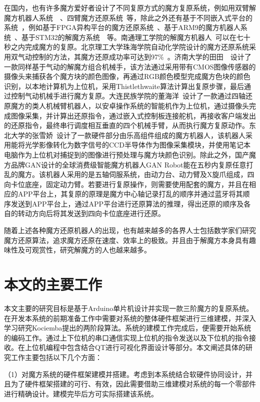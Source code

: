 在国内，也有许多魔方爱好者设计了不同复原方式的魔方复原系统，例如用双臂解魔方机器人系统~\cite{10}~\cite{11}、四臂魔方还原系统~\cite{12}等，除此之外还有基于不同嵌入式平台的系统~\cite{13}，例如基于FPGA异构平台的魔方还原系统~\cite{14}、基于ARM9的魔方机器人系统~\cite{15}、基于STM32的解魔方系统~\cite{11}~\cite{16}等。南通理工学院的解魔方机器人~\cite{17}可以在七十秒之内完成魔方的复原。北京理工大学珠海学院自动化学院设计的魔方还原系统采用双气动控制的方法，其魔方还原成功率可达到97\%~\cite{10}。济南大学的田田~\cite{18}~\cite{19}设计了一款同样基于气动的解魔方组合机械手，该方法通过采用带有CMOS图像传感器的摄像头来捕获各个魔方块的颜色图像，再通过RGB颜色模型完成魔方色块的颜色识别，以本地计算机为上位机，采用Thistlethwaite算法计算出复原步骤，最后通过控制气动机械手进行魔方复原。大连民族学院的董海洋~\cite{20}设计了一款通过四轴还原魔方的类人机械臂机器人，以安卓操作系统的智能机作为上位机，通过摄像头完成图像采集，并计算出还原指令，通过嵌入式控制板连接舵机，再接收客户端发出的还原指令，最终串行调度相互垂直的四个机械手臂，从而执行魔方复原动作。东北大学的张雪娇~\cite{21}设计了一款硬件部分由乐高组件组成的魔方机器人，该机器人采用能将光学影像转化为数字信号的CCD半导体作为图像采集模块，并使用笔记本电脑作为上位机对捕捉到的图像进行预处理与魔方块颜色识别。除此之外，国产魔方品牌GAN设计的全球消费级智能魔方机器人GAN Robot能在五秒内复原任意打乱的魔方。该机器人采用的是五轴伺服系统，由动力台、动力臂及X旋爪组成，四向卡位底座，固定动力臂。若要进行复原操作，则需要使用配套的魔方，并且在相应的APP平台上，其复原的原理是魔方中心轴记录打乱的顺序并通过蓝牙将其顺序发送到APP平台上，通过APP平台进行还原算法的推理，得出还原的顺序及各自的转动方向后将其发送到四向卡位底座进行还原。

随着上述各种魔方还原机器人的出现，也有越来越多的各界人士包括数学家们研究魔方还原算法，追求魔方还原在速度、效率上的极致。并且由于解魔方本身具有趣味性及可观赏性，研究解魔方的人也越来越多。

\section{本文的主要工作}

本文主要的研究目标是基于Arduino单片机设计并实现一款三阶魔方的复原系统。在开发本系统的前期准备工作中需要对系统的整体硬件框架进行三维建模，并深入学习研究Kociemba提出的两阶段算法。系统的建模工作完成后，便需要开始系统的编码工作。通过上下位机的串口通信实现上位机的指令发送以及下位机的指令接收。在上位机编程中包含结合QT进行可视化界面设计等部分。本文阐述具体的研究工作主要包括以下几个方面：

（1）对魔方系统的硬件框架建模并搭建。考虑到本系统结合软硬件协同设计，并且为了硬件框架搭建的可行、有效，因此需要借助三维建模对系统的每一个零部件进行精确设计。建模完毕后方可实际搭建该系统。


